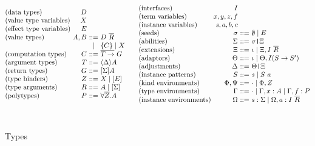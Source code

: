 \documentclass[msc,deptreport,cs]{infthesis} %
\makeatletter
\newcommand{\many}{\overline}
\newcommand\ba{\begin{array}}
\newcommand\ea{\end{array}}
\newenvironment{syn}{\ba{@{}l@{~}r@{~}c@{~}l@{}}}{\ea}
\newcommand{\adj}{\Delta}
\newcommand{\adapt}{\Theta}
\newcommand{\ext}{\Xi}
\newcommand{\sigs}{\Sigma}
\newcommand{\sig}{I}
\newcommand{\seed}{\sigma}
\newcommand{\var}{\mathit}        %
\newcommand{\thunk}[1]{\{{#1}\}}
\newcommand{\snoc}{\ }
\newcommand\slab[1]{(\textrm{#1})}
\newcommand{\ev}{E}
\newcommand{\effin}[1]{\langle {#1} \rangle}
\newcommand{\effout}[1]{[{#1}]}
\newcommand{\nowt}{\emptyset}
\newcommand{\id}{\iota}
\newcommand{\pid}{\var{s}} %
\newcommand{\kenv}{\Phi}  %
\newcommand{\kenva}{\Psi} %
\newcommand{\ienv}{\Omega} %
\newcommand{\gor}{\mid}
\newcommand{\pipe}{\texttt{|}}
\makeatother
\begin{document}
\begin{figure}  %
\[
\ba{@{}c@{}}
\ba{@{}c@{\quad\quad}c@{}}
\begin{syn}
  \slab{data types}            & D \\
  \slab{value type variables}  & X \\
  \slab{effect type variables} & E \\
  \slab{value types}           & A, B   &::= & D~\overline{R} \\
                               &        &\gor& \thunk{C} \gor X \\
  \slab{computation types}     & C      &::= & \many{T \to}~G \\
  \slab{argument types}        & T      &::= & \effin{\adj}A \\
  \slab{return types}          & G      &::= & \effout{\sigs}A \\

  \slab{type binders}          & Z      &::= & X \gor [E]\\
  \slab{type arguments}        & R      &::= & A \gor [\Sigma]\\
  \slab{polytypes}             & P      &::= & \forall \overline{Z}.A \\
\end{syn}
&
\begin{syn}
  \slab{interfaces}           & I \\
  \slab{term variables}       & x, y, z, f \\
  \slab{instance variables}   & \pid, a, b, c \\
  \slab{seeds}                & \seed  &::= & \nowt \gor \ev \\
  \slab{abilities}            & \sigs  &::= & \seed\pipe\ext \\
  \slab{extensions}           & \ext   &::= & \id \gor \ext, \sig~\many{R} \\
  \slab{adaptors}             & \adapt &::= & \id \gor \adapt, \sig(S \to S') \\
  \slab{adjustments}          & \adj   &::= & \adapt\pipe\ext \\
  \slab{instance patterns}    & S      &::= & \pid \gor S \snoc a \\
  \slab{kind environments}    & \kenv,
                                \kenva &::= & \cdot \gor \kenv, Z \\
  \slab{type environments}    & \Gamma &::= & \cdot \gor \Gamma, x:A %
                                              \gor \Gamma, f:P\\
 \slab{instance environments} & \ienv  &::= & \pid:\sigs \gor \ienv, a:\sig~\many{R}\\
\end{syn} \\
\ea \\
\ea
\]
\\[0.25cm]

\caption{Types}
\label{fig:types}
\end{figure}
\end{document}
